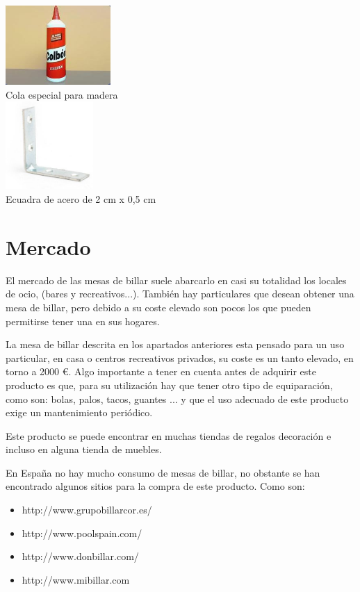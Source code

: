 \begin{center}
    		\includegraphics[width=0.3\textwidth]{cola.jpg}
		   \\ \small {Cola especial para madera} \\[0.5cm]
		\includegraphics[width=0.25\textwidth]{escuadra.jpg}
		      \\ \small {Ecuadra de acero de 2 cm  x 0,5 cm } 
	\end{center}

\clearpage
\section {Mercado}

El mercado de las mesas de billar suele abarcarlo en casi su totalidad los locales de ocio, (bares y recreativos...). También hay particulares que desean obtener una
mesa de billar, pero debido a su coste elevado son pocos los que pueden permitirse tener una en sus hogares. 

La mesa de billar descrita en los apartados anteriores esta pensado para un uso particular, en casa o centros recreativos privados, su coste es un tanto elevado, en torno a 2000 \euro.
Algo importante a tener en cuenta antes de adquirir este producto es que, para su utilización hay que tener otro tipo de equiparación, como son:  bolas, palos, tacos, guantes ... y que el uso adecuado de este producto exige un mantenimiento periódico.  

Este producto se puede encontrar en muchas tiendas de regalos decoración e incluso en alguna tienda de muebles.

En España no hay  mucho consumo de mesas de billar, no obstante se han encontrado algunos sitios para la compra de este producto.
Como son:

\begin{itemize}
  \item http://www.grupobillarcor.es/
 \item http://www.poolspain.com/
 \item http://www.donbillar.com/
 \item http://www.mibillar.com
\end{itemize}
   
